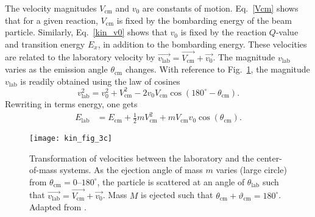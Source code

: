 The velocity magnitudes $V_\mathrm{cm}$ and $v_0$ are constants of motion.  Eq.~\ref{Vcm} shows that for a given reaction, $V_\mathrm{cm}$ is fixed by the bombarding energy of the beam particle.  Similarly, Eq.~\ref{kin_v0} shows that $v_0$ is fixed by the reaction $Q$-value and transition energy $E_x$, in addition to the bombarding energy.
These velocities are related to the laboratory velocity by $\vec{v_\mathrm{lab}}=\vec{V_\mathrm{cm}}+ \vec{v_0}$.  The magnitude $v_\mathrm{lab}$ varies as the emission angle $\theta_\mathrm{cm}$ changes.  %
With reference to Fig.~\ref{big_kin}, the magnitude $v_\mathrm{lab}$ is readily obtained using the law of cosines
\begin{equation}
v_\mathrm{lab}^2=v_0^2+V_\mathrm{cm}^2-2v_0 V_\mathrm{cm}\cos(180^\circ - \theta_\mathrm{cm}).
\label{eq:law_of_cosines}
\end{equation}
Rewriting in terms energy, one gets
\begin{equation}
\begin{split}
E_\mathrm{lab}%
&=E_\mathrm{cm}+\frac{1}{2} m V_\mathrm{cm}^2 +m V_\mathrm{cm}v_0 \cos(\theta_\mathrm{cm}).
\end{split}
\label{elab}
\end{equation}

\begin{figure}%
\centering
\texttt{[image: kin\_fig\_3c]}
\caption[Transformation of velocities between the laboratory and the center-of-mass systems]{Transformation of velocities between the laboratory and the center-of-mass systems. As the ejection angle of mass $m$ varies (large circle) from $\theta_\mathrm{cm}=0$--$180^\circ$, the particle is scattered at an angle of $\theta_\mathrm{lab}$ such that $\vec{v_\mathrm{lab}}=\vec{V_\mathrm{cm}}+\vec{v_0}$.
  Mass $M$ is ejected such that $\theta_\mathrm{cm}+\vartheta_\mathrm{cm}=180^\circ$.
Adapted from \citet[Fig.~11]{Michalowicz_1967}.}
\label{big_kin}%
\end{figure}


